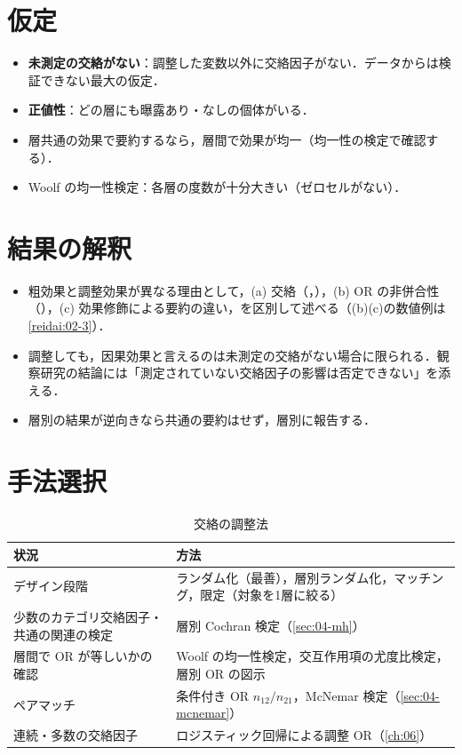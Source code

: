 \section{仮定}\label{sec:07-assump}
\begin{itemize}
\item \textbf{未測定の交絡がない}：調整した変数以外に交絡因子がない．データからは検証できない最大の仮定．
\item \textbf{正値性}：どの層にも曝露あり・なしの個体がいる．
\item 層共通の効果で要約するなら，層間で効果が均一（均一性の検定で確認する）．
\item Woolf の均一性検定：各層の度数が十分大きい（ゼロセルがない）．
\end{itemize}

\section{結果の解釈}\label{sec:07-interp}
\begin{itemize}
\item 粗効果と調整効果が異なる理由として，(a) 交絡（，），(b) OR の非併合性（），(c) 効果修飾による要約の違い，を区別して述べる（(b)(c)の数値例は\cref{reidai:02-3}）．
\item 調整しても，因果効果と言えるのは未測定の交絡がない場合に限られる．観察研究の結論には「測定されていない交絡因子の影響は否定できない」を添える．
\item 層別の結果が逆向きなら共通の要約はせず，層別に報告する．
\end{itemize}

\section{手法選択}\label{sec:07-choice}
\begin{table}[htbp]
\centering\small
\caption{交絡の調整法}\label{tab:07-choice}
\begin{tabular}{@{}L{48mm}L{87mm}@{}}
\toprule
状況 & 方法\\
\midrule
デザイン段階 & ランダム化（最善），層別ランダム化，マッチング，限定（対象を1層に絞る）\\
少数のカテゴリ交絡因子・共通の関連の検定 & 層別 Cochran 検定（\cref{sec:04-mh}）\\
層間で OR が等しいかの確認 & Woolf の均一性検定，交互作用項の尤度比検定，層別 OR の図示\\
ペアマッチ & 条件付き OR $n_{12}/n_{21}$，McNemar 検定（\cref{sec:04-mcnemar}）\\
連続・多数の交絡因子 & ロジスティック回帰による調整 OR（\cref{ch:06}）\\
\bottomrule
\end{tabular}
\end{table}

